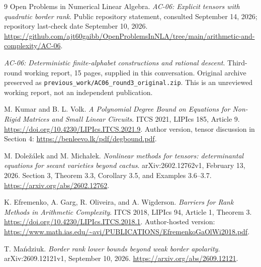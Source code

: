 \documentclass[11pt]{article}
\theoremstyle{definition}
\theoremstyle{remark}
\begin{document}
{\small
\setlength{\parskip}{0.2em}
\begin{thebibliography}{9}
\setlength{\itemsep}{0.3em}
Open Problems in Numerical Linear Algebra.
\emph{AC-06: Explicit tensors with quadratic border rank}.
Public repository statement, consulted September 14, 2026; repository last-check date September 10, 2026.
\url{https://github.com/ajt60gaibb/OpenProblemsInNLA/tree/main/arithmetic-and-complexity/AC-06}.

\emph{AC-06: Deterministic finite-alphabet constructions and rational descent}.
Third-round working report, 15 pages, supplied in this conversation.
Original archive preserved as \texttt{previous\_work/AC06\_round3\_original.zip}.
This is an unreviewed working report, not an independent publication.

M. Kumar and B. L. Volk.
\emph{A Polynomial Degree Bound on Equations for Non-Rigid Matrices and Small Linear Circuits}.
ITCS 2021, LIPIcs 185, Article 9.
\url{https://doi.org/10.4230/LIPIcs.ITCS.2021.9}.
Author version, tensor discussion in Section 4:
\url{https://benleevo.lk/pdf/degbound.pdf}.

M. Dole\v{z}\'{a}lek and M. Micha\l{}ek.
\emph{Nonlinear methods for tensors: determinantal equations for secant varieties beyond cactus}.
arXiv:2602.12762v1, February 13, 2026. Section 3, Theorem 3.3, Corollary 3.5, and Examples 3.6--3.7.
\url{https://arxiv.org/abs/2602.12762}.

K. Efremenko, A. Garg, R. Oliveira, and A. Wigderson.
\emph{Barriers for Rank Methods in Arithmetic Complexity}.
ITCS 2018, LIPIcs 94, Article 1, Theorem 3.
\url{https://doi.org/10.4230/LIPIcs.ITCS.2018.1}.
Author-hosted version:
\url{https://www.math.ias.edu/~avi/PUBLICATIONS/EfremenkoGaOlWi2018.pdf}.

T. Ma\'{n}dziuk.
\emph{Border rank lower bounds beyond weak border apolarity}.
arXiv:2609.12121v1, September 10, 2026.
\url{https://arxiv.org/abs/2609.12121}.
\end{thebibliography}
}
\end{document}
